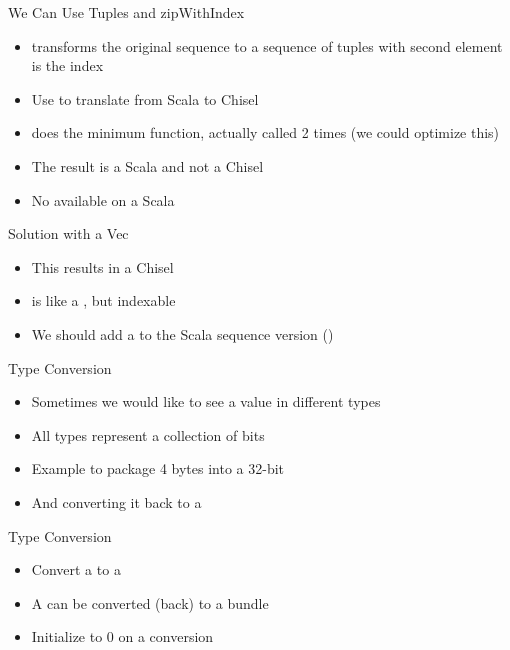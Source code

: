 \begin{frame}[fragile]{We Can Use Tuples and zipWithIndex}
\begin{itemize}
\item {} transforms the original sequence to a sequence of tuples with second element is the index
\item Use  to translate from Scala  to Chisel 
\item {} does the minimum function, actually called 2 times (we could optimize this)
\item The result is a Scala  and not a Chisel 
\item No  available on a Scala 
\end{itemize}
\end{frame}

\begin{frame}[fragile]{Solution with a Vec}
\begin{itemize}
\item This results in a Chisel 
\item {} is like a , but indexable
\item We should add a  to the Scala sequence version ()
\end{itemize}
\end{frame}


\begin{frame}[fragile]{Type Conversion}
\begin{itemize}
\item Sometimes we would like to see a value in different types
\item All types represent a collection of bits
\item Example to package 4 bytes into a 32-bit 
\item And converting it back to a 
\end{itemize}
\end{frame}

\begin{frame}[fragile]{Type Conversion}
\begin{itemize}
\item Convert a  to a 
\item A  can be converted (back) to a bundle
\item Initialize to 0 on a conversion
\end{itemize}
\end{frame}


